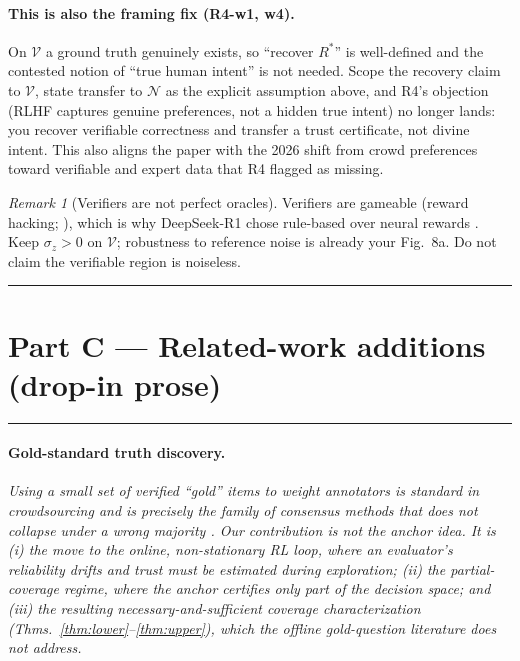 \documentclass[11pt]{article}
\theoremstyle{definition}
\theoremstyle{remark}
\newtheorem{remark}{Remark}
\newcommand{\Rstar}{R^{\ast}}
\begin{document}
\paragraph{This is also the framing fix (R4-w1, w4).}
On $\mathcal V$ a ground truth genuinely exists, so ``recover $\Rstar$'' is well-defined and the
contested notion of ``true human intent'' is not needed. Scope the recovery claim to $\mathcal V$,
state transfer to $\mathcal N$ as the explicit assumption above, and R4's objection (RLHF captures
genuine preferences, not a hidden true intent) no longer lands: you recover verifiable correctness
and transfer a trust certificate, not divine intent. This also aligns the paper with the 2026 shift
from crowd preferences toward verifiable and expert data that R4 flagged as missing.

\begin{remark}[Verifiers are not perfect oracles]
Verifiers are gameable (reward hacking; \citealp{skalse2022reward}), which is why DeepSeek-R1 chose
rule-based over neural rewards \citep{guo2025deepseekr1}. Keep $\sigma_z>0$ on $\mathcal V$;
robustness to reference noise is already your Fig.~8a. Do not claim the verifiable region is
noiseless.
\end{remark}

\bigskip
\hrule
\section*{Part C --- Related-work additions (drop-in prose)}
\hrule


\paragraph{Gold-standard truth discovery.}
\noindent\emph{Using a small set of verified ``gold'' items to weight annotators is standard in
crowdsourcing and is precisely the family of consensus methods that does \emph{not} collapse under
a wrong majority \citep[e.g.][]{dawid1979,li2016survey}. Our contribution is not the anchor idea.
It is (i) the move to the online, non-stationary RL loop, where an evaluator's reliability drifts
and trust must be estimated during exploration; (ii) the \emph{partial-coverage} regime, where the
anchor certifies only part of the decision space; and (iii) the resulting necessary-and-sufficient
coverage characterization (Thms.~\ref{thm:lower}--\ref{thm:upper}), which the offline gold-question
literature does not address.}
\end{document}
